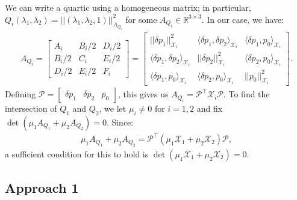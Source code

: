 \documentclass{article}
\theoremstyle{definition}
\begin{document}
We can write a quartic using a homogeneous matrix; in particular,
$Q_i(\lambda_1, \lambda_2) = ||(\lambda_1, \lambda_2,
1)||_{A_{Q_i}}^2$ for some $A_{Q_i} \in \mathbb{R}^{3 \times 3}$. In our case, we have:
\begin{align*}
  A_{Q_i} = \begin{bmatrix}
    A_i & B_i/2 & D_i/2 \\
    B_i/2 & C_i & E_i/2 \\
    D_i/2 & E_i/2 & F_i
  \end{bmatrix} = \begin{bmatrix}
    ||\delta p_1||_{\mathcal{X}_i}^2 & \langle \delta p_1, \delta p_2 \rangle_{\mathcal{X}_i} & \langle \delta p_1, p_0 \rangle_{\mathcal{X}_i} \\
    \langle \delta p_1, \delta p_2 \rangle_{\mathcal{X}_i} & ||\delta p_2||_{\mathcal{X}_i}^2 & \langle \delta p_2, p_0 \rangle_{\mathcal{X}_i} \\
    \langle \delta p_1, p_0 \rangle_{\mathcal{X}_i} & \langle \delta p_2, p_0 \rangle_{\mathcal{X}_i} & ||p_0||_{\mathcal{X}_i}^2
  \end{bmatrix}.
\end{align*}
Defining
$\mathcal{P} = \begin{bmatrix} \delta p_1 & \delta p_2 &
  p_0 \end{bmatrix}$, this gives us
$A_{Q_i} = \mathcal{P}^\top \mathcal{X}_i \mathcal{P}$. To find the
intersection of $Q_1$ and $Q_2$, we let $\mu_i \neq 0$ for $i = 1, 2$
and fix $\det(\mu_1 A_{Q_1} + \mu_2 A_{Q_2}) = 0$. Since:
\begin{align*}
  \mu_1 A_{Q_1} + \mu_2 A_{Q_2} = \mathcal{P}^\top {(\mu_1 \mathcal{X}_1 + \mu_2 \mathcal{X}_2)} \mathcal{P},
\end{align*}
a sufficient condition for this to hold is
$\det(\mu_1 \mathcal{X}_1 + \mu_2 \mathcal{X}_2) = 0$.

\subsection*{Approach 1}
\end{document}
